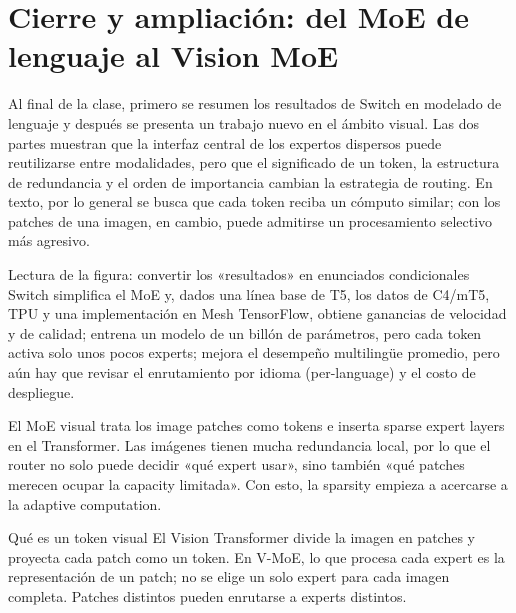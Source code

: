 \section{Cierre y ampliación: del MoE de lenguaje al Vision MoE}

Al final de la clase, primero se resumen los resultados de Switch en modelado de lenguaje y después se presenta un trabajo nuevo en el ámbito visual. Las dos partes muestran que la interfaz central de los expertos dispersos puede reutilizarse entre modalidades, pero que el significado de un token, la estructura de redundancia y el orden de importancia cambian la estrategia de routing. En texto, por lo general se busca que cada token reciba un cómputo similar; con los patches de una imagen, en cambio, puede admitirse un procesamiento selectivo más agresivo.


\begin{knowledgebox}{Lectura de la figura: convertir los «resultados» en enunciados condicionales}
Switch simplifica el MoE y, dados una línea base de T5, los datos de C4/mT5, TPU y una implementación en Mesh TensorFlow, obtiene ganancias de velocidad y de calidad; entrena un modelo de un billón de parámetros, pero cada token activa solo unos pocos experts; mejora el desempeño multilingüe promedio, pero aún hay que revisar el enrutamiento por idioma (per-language) y el costo de despliegue.
\end{knowledgebox}

El MoE visual trata los image patches como tokens e inserta sparse expert layers en el Transformer. Las imágenes tienen mucha redundancia local, por lo que el router no solo puede decidir «qué expert usar», sino también «qué patches merecen ocupar la capacity limitada». Con esto, la sparsity empieza a acercarse a la adaptive computation.


\begin{knowledgebox}{Qué es un token visual}
El Vision Transformer divide la imagen en patches y proyecta cada patch como un token. En V-MoE, lo que procesa cada expert es la representación de un patch; no se elige un solo expert para cada imagen completa. Patches distintos pueden enrutarse a experts distintos.
\end{knowledgebox}

